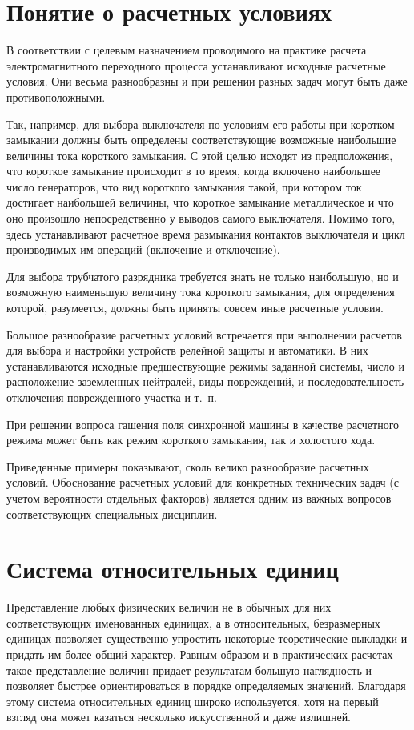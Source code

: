 \section{Понятие о расчетных условиях}
\label{sec:2-2}

В соответствии с целевым назначением проводимого на практике расчета электромагнитного переходного процесса устанавливают исходные расчетные условия. Они весьма разнообразны и при решении разных задач могут быть даже противоположными.

Так, например, для выбора выключателя по условиям его работы при коротком замыкании должны быть определены соответствующие возможные наибольшие величины тока короткого замыкания. С этой целью исходят из предположения, что короткое замыкание происходит в то время, когда включено наибольшее число генераторов, что вид короткого замыкания такой, при котором ток достигает наибольшей величины, что короткое замыкание металлическое и что оно произошло непосредственно у выводов самого выключателя. Помимо того, здесь устанавливают расчетное время размыкания контактов выключателя и цикл производимых им операций (включение и отключение).

Для выбора трубчатого разрядника требуется знать не только наибольшую, но и возможную наименьшую величину тока короткого замыкания, для определения которой, разумеется, должны быть приняты совсем иные расчетные условия.

Большое разнообразие расчетных условий встречается при выполнении расчетов для выбора и настройки устройств релейной защиты и автоматики. В них устанавливаются исходные предшествующие режимы заданной системы, число и расположение заземленных нейтралей, виды повреждений, и последовательность отключения поврежденного участка и т.~п.

При решении вопроса гашения поля синхронной машины в качестве расчетного режима может быть как режим короткого замыкания, так и холостого хода.

Приведенные примеры показывают, сколь велико разнообразие расчетных условий. Обоснование расчетных условий для конкретных технических задач (с учетом вероятности отдельных факторов) является одним из важных вопросов соответствующих специальных дисциплин.

\section{Система относительных единиц}
\label{sec:2-3}

Представление любых физических величин не в обычных для них соответствующих именованных единицах, а в относительных, безразмерных единицах позволяет существенно упростить некоторые теоретические выкладки и придать им более общий характер. Равным образом и в практических расчетах такое представление величин придает результатам большую наглядность и позволяет быстрее ориентироваться в порядке определяемых значений. Благодаря этому система относительных единиц широко используется, хотя на первый взгляд она может казаться несколько искусственной и даже излишней.

